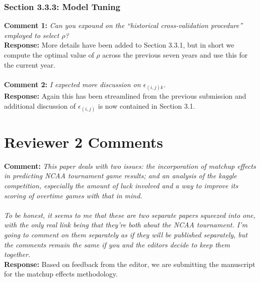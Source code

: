 \documentclass[11pt]{article} %
\begin{document}
\subsubsection*{Section 3.3.3: Model Tuning}
{\bf Comment 1:} \emph{Can you expound on the ``historical cross-validation procedure'' employed to select $\rho$?\\}
{\bf Response:} More details have been added to Section 3.3.1, but in short we compute the optimal value of $\rho$ across the previous seven years and use this for the current year.\\
\\
{\bf Comment 2:} \emph{I expected more discussion on $\epsilon_{(i,j)k}$.\\}
{\bf Response:}  Again this has been streamlined from the previous submission and additional discussion of $\epsilon_{(i,j)}$ is now contained in Section 3.1.\\
\newpage
\section*{Reviewer 2 Comments}
{\bf Comment:} \emph{This paper deals with two issues: the incorporation of matchup effects in predicting NCAA tournament game results; and an analysis of the kaggle competition, especially the amount of luck involved and a way to improve its scoring of overtime games with that in mind.\\
\\
To be honest, it seems to me that these are two separate papers squeezed into one, with the only real link being that they're both about the NCAA tournament. I'm going to comment on them separately as if they will be published separately, but the comments remain the same if you and the editors decide to keep them together.\\}
{\bf Response:} Based on feedback from the editor, we are submitting the manuscript for the matchup effects methodology.\\
\\
\end{document}
